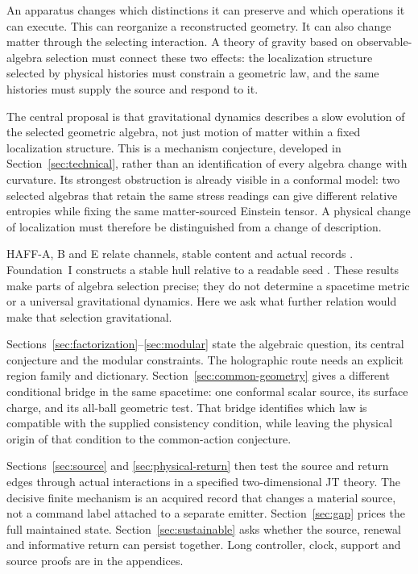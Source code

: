 An apparatus changes which distinctions it can preserve and which operations
it can execute. This can reorganize a reconstructed geometry. It can also
change matter through the selecting interaction. A theory of gravity based
on observable-algebra selection must connect these two effects: the
localization structure selected by physical histories must constrain a
geometric law, and the same histories must supply the source and respond to it.

The central proposal is that gravitational dynamics describes a slow
evolution of the selected geometric algebra, not just motion of matter
within a fixed localization structure. This is a mechanism conjecture,
developed in Section~\ref{sec:technical}, rather than an identification of
every algebra change with curvature. Its strongest obstruction is already
visible in a conformal model: two selected algebras that retain the same
stress readings can give different relative entropies while fixing the
same matter-sourced Einstein tensor. A physical change of localization
must therefore be distinguished from a change of description.

HAFF-A, B and E relate channels, stable content and actual records
\cite{Liu2026PaperA,Liu2026PaperB}. Foundation~I constructs a stable hull
relative to a readable seed \cite{FoundationI}. These results make parts
of algebra selection precise; they do not determine a spacetime metric
or a universal gravitational dynamics. Here we ask what further relation
would make that selection gravitational.

Sections~\ref{sec:factorization}--\ref{sec:modular} state the algebraic
question, its central conjecture and the modular constraints. The
holographic route needs an explicit region family and dictionary.
Section~\ref{sec:common-geometry} gives a different conditional bridge
in the same spacetime: one conformal scalar source, its surface charge,
and its all-ball geometric test. That bridge identifies which law is
compatible with the supplied consistency condition, while leaving the
physical origin of that condition to the common-action conjecture.

Sections~\ref{sec:source} and \ref{sec:physical-return} then test the
source and return edges through actual interactions in a specified
two-dimensional JT theory. The decisive finite mechanism is an acquired
record that changes a material source, not a command label attached to a
separate emitter. Section~\ref{sec:gap} prices the full maintained state.
Section~\ref{sec:sustainable} asks whether the source, renewal and
informative return can persist together. Long controller, clock,
support and source proofs are in the appendices.

